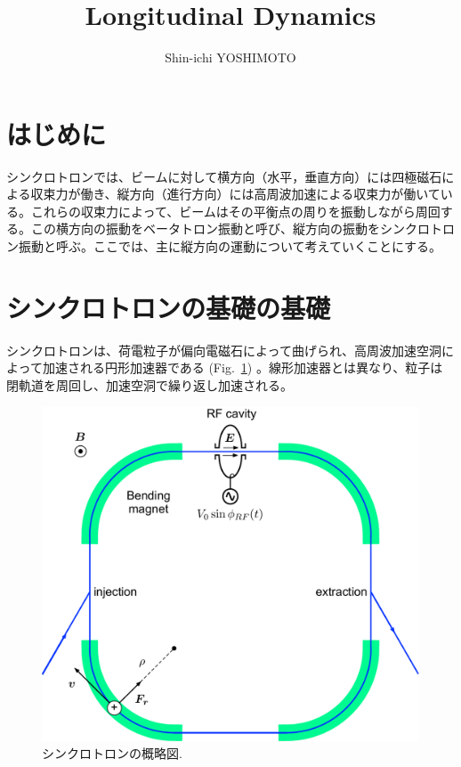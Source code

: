 \documentclass[10pt,a4paper]{jlreq}
\begin{document}
\title{Longitudinal Dynamics}
\author{Shin-ichi YOSHIMOTO}
\maketitle
\tableofcontents
\clearpage

\section{はじめに}
シンクロトロンでは、ビームに対して横方向（水平，垂直方向）には四極磁石による収束力が働き、縦方向（進行方向）には高周波加速による収束力が働いている。これらの収束力によって、ビームはその平衡点の周りを振動しながら周回する。この横方向の振動をベータトロン振動と呼び、縦方向の振動をシンクロトロン振動と呼ぶ。ここでは、主に縦方向の運動について考えていくことにする。

\section{シンクロトロンの基礎の基礎}
シンクロトロンは、荷電粒子が偏向電磁石によって曲げられ、高周波加速空洞によって加速される円形加速器である (Fig.~\ref{synchrotron}) 。線形加速器とは異なり、粒子は閉軌道を周回し、加速空洞で繰り返し加速される。
%
\begin{figure}[hbt]
  \begin{center}
    \includegraphics[width=12cm,clip]{figs/synchrotron.pdf}
    \caption{シンクロトロンの概略図.}
   \label{synchrotron}
  \end{center}
\end{figure}
\end{document}
